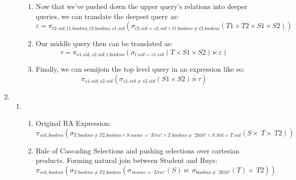 \documentclass{article}
\begin{document}
\begin{enumerate}
\begin{enumerate}
\begin{enumerate}
            \item Now that we've pushed down the upper query's relations into deeper queries, we can translate the deepest
            query as:
            \begin{displaymath}
                \varepsilon = \pi_{t2.sid, t1.bookno, t2.bookno, s1.sid}(\sigma_{t2.sid=s2.sid \wedge t1.bookno \ne t2.bookno}(T1 \times T2 \times S1 \times S2))
            \end{displaymath}

            \item Our middle query then can be translated as:
            \begin{displaymath}
                \tau = \pi_{s1.sid, s2.sid, t.bookno}(\sigma_{t.sid=s1.sid}(T \times S1 \times S2) \overline{\ltimes} \varepsilon)
            \end{displaymath}

            \item Finally, we can semijoin the top level query in an expression like so:
            \begin{displaymath}
                \pi_{s1.sid, s2.sid}(\sigma_{s1.sid \ne s2.sid}(S1 \times S2) \overline{\ltimes} \tau)
            \end{displaymath}

        \end{enumerate}
    \end{enumerate}

    \newpage

    \item  %
    \begin{enumerate}

    \item %
    \begin{enumerate}
            \item %
            Original RA Expression:
            \begin{displaymath}
                \pi_{sid, bookno}
                    (\sigma_{T.bookno \ne T2.bookno \wedge S.name='Eric' \wedge T.bookno \ne '2010' \wedge S.Sid=T.sid}
                        (S \times\ T \times\ T2))
            \end{displaymath}

            \item Rule of Cascading Selections and pushing selections over cartesian products. Forming natural join between Student and Buys:
            \begin{displaymath}
                \pi_{sid, bookno}
                    (\sigma_{T.bookno \ne T2.bookno}
                        (\sigma_{sname='Eric'}(S) \bowtie\ \sigma_{bookno \ne '2010'}(T) \times\ T2))
            \end{displaymath}


\end{enumerate}
\end{enumerate}
\end{enumerate}
\end{document}
